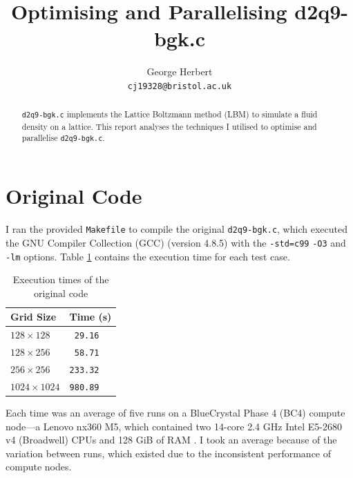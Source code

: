 \documentclass[twocolumn, a4paper]{article}
\author{
  George Herbert\\
  \texttt{cj19328@bristol.ac.uk}
}
\title{\vspace{-2em}Optimising and Parallelising d2q9-bgk.c}
\begin{document}
\maketitle

\begin{abstract}
    \texttt{d2q9-bgk.c} implements the Lattice Boltzmann method (LBM) to simulate a fluid density on a lattice.
    This report analyses the techniques I utilised to optimise and parallelise \texttt{d2q9-bgk.c}.
\end{abstract}

\section{Original Code}

I ran the provided \texttt{Makefile} to compile the original \texttt{d2q9-bgk.c}, which executed the GNU Compiler Collection (GCC) (version 4.8.5) with the \texttt{-std=c99} \texttt{-O3} and \texttt{-lm} options.
Table \ref{tab:original} contains the execution time for each test case.

\begin{table}[htbp]
  \begin{center}
  \caption{Execution times of the original code}\label{tab:original}
  \begin{tabular}[t]{l | l} 
      \hline\hline
      Grid Size&Time (s)\\
      \hline
      $128 \times 128$&\texttt{ 29.16}\\
      $128 \times 256$&\texttt{ 58.71}\\
      $256 \times 256$&\texttt{233.32}\\
      $1024 \times 1024$&\texttt{980.89}\\
      \hline
    \end{tabular}
  \end{center}
\end{table} 

Each time was an average of five runs on a BlueCrystal Phase 4 (BC4) compute node---a Lenovo nx360 M5, which contained two 14-core 2.4 GHz Intel E5-2680 v4 (Broadwell) CPUs and 128 GiB of RAM \cite{bcp4}.
I took an average because of the variation between runs, which existed due to the inconsistent performance of compute nodes.
\end{document}
